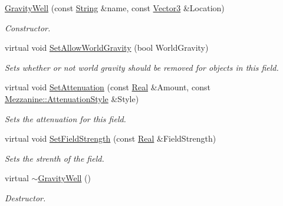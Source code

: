 \begin{DoxyCompactItemize}
\hyperlink{classMezzanine_1_1GravityWell_a4f89751efb62bd71164a2864923dc149}{GravityWell} (const \hyperlink{namespaceMezzanine_acf9fcc130e6ebf08e3d8491aebcf1c86}{String} \&name, const \hyperlink{classMezzanine_1_1Vector3}{Vector3} \&Location)
\begin{DoxyCompactList}\small\item\em Constructor. \item\end{DoxyCompactList}\item 
virtual void \hyperlink{classMezzanine_1_1GravityWell_a80837168a132c3bffcefb839e1669a63}{SetAllowWorldGravity} (bool WorldGravity)
\begin{DoxyCompactList}\small\item\em Sets whether or not world gravity should be removed for objects in this field. \item\end{DoxyCompactList}\item 
virtual void \hyperlink{classMezzanine_1_1GravityWell_ab7668c7c5c1c7c25a40315803efb0790}{SetAttenuation} (const \hyperlink{namespaceMezzanine_a726731b1a7df72bf3583e4a97282c6f6}{Real} \&Amount, const \hyperlink{namespaceMezzanine_a2d10a79e11a2031df10af540eede12fa}{Mezzanine::AttenuationStyle} \&Style)
\begin{DoxyCompactList}\small\item\em Sets the attenuation for this field. \item\end{DoxyCompactList}\item 
virtual void \hyperlink{classMezzanine_1_1GravityWell_a596a662feae83e04e4c299a8aaf8b862}{SetFieldStrength} (const \hyperlink{namespaceMezzanine_a726731b1a7df72bf3583e4a97282c6f6}{Real} \&FieldStrength)
\begin{DoxyCompactList}\small\item\em Sets the strenth of the field. \item\end{DoxyCompactList}\item 
virtual \hyperlink{classMezzanine_1_1GravityWell_affc992ad5e1edafd654d16d6a13840d0}{$\sim$GravityWell} ()
\begin{DoxyCompactList}\small\item\em Destructor. \item\end{DoxyCompactList}\end{DoxyCompactItemize}
